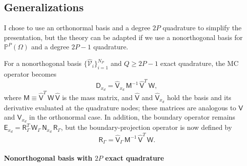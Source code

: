 \documentclass[pdflatex,sn-mathphys-num]{sn-jnl}%
\theoremstyle{thmstyleone}%
\theoremstyle{thmstyletwo}%
\theoremstyle{thmstylethree}%
\newcommand{\mat}[1]{\ensuremath{\mathsf{#1}}}
\newcommand{\fnc}[1]{\ensuremath{\mathcal{#1}}}
\begin{document}
\subsection{Generalizations}\label{sec:generalizations}

I chose to use an orthonormal basis and a degree $2P$ quadrature to simplify the presentation, but the theory can be adapted if we use a nonorthogonal basis for $\mathbb{P}^{P}(\Omega)$ and a degree $2P-1$ quadrature.

For a nonorthogonal basis $\{ \hat{\fnc{V}}_i \}_{i=1}^{N_P}$ and $Q \geq 2P -1$ exact quadrature, the MC operator becomes~\cite{Chan2018discretely}
\begin{equation}\label{eq:mc_nonortho}
    \mat{D}_{x_d} = \hat{\mat{V}}_{x_d} \, \mat{M}^{-1} \, \hat{\mat{V}}^T \,\mat{W},
\end{equation}
where $\mat{M} \equiv \hat{\mat{V}}^T \, \mat{W} \, \hat{\mat{V}}$ is the mass matrix, and $\hat{\mat{V}}$ and $\hat{\mat{V}}_{x_d}$ hold the basis and its derivative evaluated at the quadrature nodes; these matrices are analogous to $\mat{V}$ and $\mat{V}_{x_d}$ in the orthonormal case.  In addition, the boundary operator remains $\mat{E}_{x_d} = \mat{R}_{\Gamma}^T \, \mat{W}_{\Gamma} \, \mat{N}_{x_d} \, \mat{R}_{\Gamma}$, but the boundary-projection operator is now defined by~\cite{Chan2018discretely}
\begin{equation}\label{eq:proj_nonortho}
    \mat{R}_{\Gamma} = \hat{\mat{V}}_{\Gamma} \, \mat{M}^{-1} \, \hat{\mat{V}}^T \, \mat{W}.
\end{equation}

\paragraph{Nonorthogonal basis with $2P$ exact quadrature}
\end{document}
